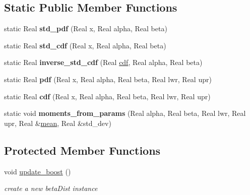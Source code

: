 \subsection*{Static Public Member Functions}
\begin{DoxyCompactItemize}
\item 
static Real {\bfseries std\+\_\+pdf} (Real x, Real alpha, Real beta)\label{classPecos_1_1BetaRandomVariable_a6e32e04360dd9ebde5708412529b4c90}

\item 
static Real {\bfseries std\+\_\+cdf} (Real x, Real alpha, Real beta)\label{classPecos_1_1BetaRandomVariable_a80475bc6525448bf737486a6f2566116}

\item 
static Real {\bfseries inverse\+\_\+std\+\_\+cdf} (Real \hyperlink{classPecos_1_1BetaRandomVariable_addd564e7f4f314e12d38df74d845f0d8}{cdf}, Real alpha, Real beta)\label{classPecos_1_1BetaRandomVariable_ac31749979131683659e37e1eb7841e4e}

\item 
static Real {\bfseries pdf} (Real x, Real alpha, Real beta, Real lwr, Real upr)\label{classPecos_1_1BetaRandomVariable_adcf2fd976567fb799f3136d18185bf2b}

\item 
static Real {\bfseries cdf} (Real x, Real alpha, Real beta, Real lwr, Real upr)\label{classPecos_1_1BetaRandomVariable_a8abd3c476eb56d9e00bcaeb5f04dd045}

\item 
static void {\bfseries moments\+\_\+from\+\_\+params} (Real alpha, Real beta, Real lwr, Real upr, Real \&\hyperlink{classPecos_1_1BetaRandomVariable_a962ffe5a3593be370d5c883365c060f4}{mean}, Real \&std\+\_\+dev)\label{classPecos_1_1BetaRandomVariable_ab1648d3674b3fa004b33600fe5c59fad}

\end{DoxyCompactItemize}
\subsection*{Protected Member Functions}
\begin{DoxyCompactItemize}
\item 
void \hyperlink{classPecos_1_1BetaRandomVariable_aaa6750cbee2245416a6eeeac58d4405a}{update\+\_\+boost} ()\label{classPecos_1_1BetaRandomVariable_aaa6750cbee2245416a6eeeac58d4405a}

\begin{DoxyCompactList}\small\item\em create a new beta\+Dist instance \end{DoxyCompactList}\end{DoxyCompactItemize}
